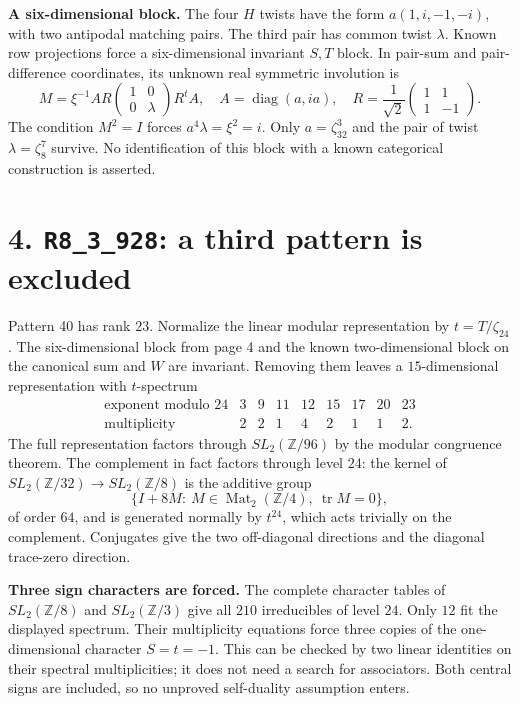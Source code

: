\documentclass[11pt,a4paper]{article}
\newcommand{\R}[1]{\texttt{#1}}
\newcommand{\z}{\zeta}
\begin{document}
\textbf{A six-dimensional block.} The four $H$ twists have the form $a(1,i,-1,-i)$, with two antipodal matching pairs. The third pair has common twist $\lambda$. Known row projections force a six-dimensional invariant $S,T$ block. In pair-sum and pair-difference coordinates, its unknown real symmetric involution is
\[
M=\xi^{-1}A R\begin{pmatrix}1&0\\0&\lambda\end{pmatrix}R^t A,
\quad A=\operatorname{diag}(a,ia),\quad
R=\frac1{\sqrt2}\begin{pmatrix}1&1\\1&-1\end{pmatrix}.
\]
The condition $M^2=I$ forces $a^4\lambda=\xi^2=i$. Only
$a=\z_{32}^{3}$ and the pair of twist $\lambda=\z_8^7$ survive. No identification of this block with a known categorical construction is asserted.

\newpage
\section*{4. \R{R8\_3\_928}: a third pattern is excluded}
Pattern 40 has rank $23$. Normalize the linear modular representation by $t=T/\z_{24}$. The six-dimensional block from page 4 and the known two-dimensional block on the canonical sum and $W$ are invariant. Removing them leaves a $15$-dimensional representation with $t$-spectrum
\[
\begin{array}{c|rrrrrrrr}
\text{exponent modulo }24&3&9&11&12&15&17&20&23\\\hline
\text{multiplicity}&2&2&1&4&2&1&1&2.
\end{array}
\]
The full representation factors through $SL_2(\mathbb Z/96)$ by the modular congruence theorem. The complement in fact factors through level $24$: the kernel of $SL_2(\mathbb Z/32)\to SL_2(\mathbb Z/8)$ is the additive group
\[
\{I+8M:\ M\in\operatorname{Mat}_2(\mathbb Z/4),\ \operatorname{tr}M=0\},
\]
of order $64$, and is generated normally by $t^{24}$, which acts trivially on the complement. Conjugates give the two off-diagonal directions and the diagonal trace-zero direction.

\textbf{Three sign characters are forced.} The complete character tables of $SL_2(\mathbb Z/8)$ and $SL_2(\mathbb Z/3)$ give all $210$ irreducibles of level $24$. Only $12$ fit the displayed spectrum. Their multiplicity equations force three copies of the one-dimensional character $S=t=-1$. This can be checked by two linear identities on their spectral multiplicities; it does not need a search for associators. Both central signs are included, so no unproved self-duality assumption enters.
\end{document}
